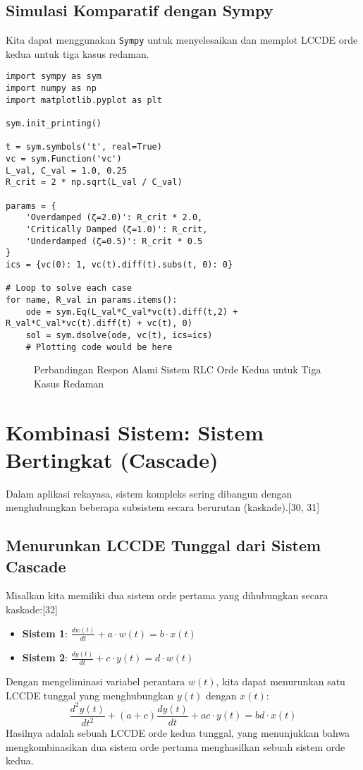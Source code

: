 \documentclass[12pt, a4paper]{article}
\begin{document}
\subsection{Simulasi Komparatif dengan Sympy}
Kita dapat menggunakan \texttt{Sympy} untuk menyelesaikan dan memplot LCCDE orde kedua untuk tiga kasus redaman.
\begin{lstlisting}
import sympy as sym
import numpy as np
import matplotlib.pyplot as plt

sym.init_printing()

t = sym.symbols('t', real=True)
vc = sym.Function('vc')
L_val, C_val = 1.0, 0.25
R_crit = 2 * np.sqrt(L_val / C_val)

params = {
    'Overdamped (ζ=2.0)': R_crit * 2.0,
    'Critically Damped (ζ=1.0)': R_crit,
    'Underdamped (ζ=0.5)': R_crit * 0.5
}
ics = {vc(0): 1, vc(t).diff(t).subs(t, 0): 0}

# Loop to solve each case
for name, R_val in params.items():
    ode = sym.Eq(L_val*C_val*vc(t).diff(t,2) + R_val*C_val*vc(t).diff(t) + vc(t), 0)
    sol = sym.dsolve(ode, vc(t), ics=ics)
    # Plotting code would be here
\end{lstlisting}

\begin{figure}[H]
    \centering
    \caption{Perbandingan Respon Alami Sistem RLC Orde Kedua untuk Tiga Kasus Redaman}
    \label{fig:rlc-responses}
\end{figure}

\section{Kombinasi Sistem: Sistem Bertingkat (Cascade)}
Dalam aplikasi rekayasa, sistem kompleks sering dibangun dengan menghubungkan beberapa subsistem secara berurutan (kaskade).[30, 31]

\subsection{Menurunkan LCCDE Tunggal dari Sistem Cascade}
Misalkan kita memiliki dua sistem orde pertama yang dihubungkan secara kaskade:[32]
\begin{itemize}
    \item \textbf{Sistem 1}: $\frac{dw(t)}{dt} + a \cdot w(t) = b \cdot x(t)$
    \item \textbf{Sistem 2}: $\frac{dy(t)}{dt} + c \cdot y(t) = d \cdot w(t)$
\end{itemize}
Dengan mengeliminasi variabel perantara $w(t)$, kita dapat menurunkan satu LCCDE tunggal yang menghubungkan $y(t)$ dengan $x(t)$:
\[
\frac{d^2y(t)}{dt^2} + (a+c) \frac{dy(t)}{dt} + ac \cdot y(t) = bd \cdot x(t)
\]
Hasilnya adalah sebuah LCCDE orde kedua tunggal, yang menunjukkan bahwa mengkombinasikan dua sistem orde pertama menghasilkan sebuah sistem orde kedua.
\end{document}
